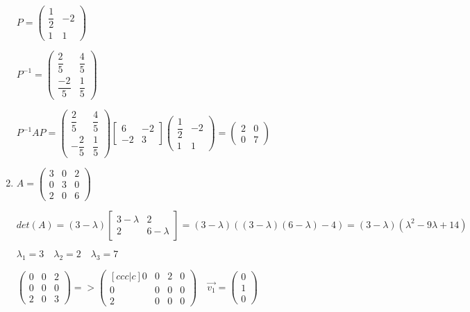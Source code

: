 \documentclass[12pt,letterpaper]{article}
\begin{document}
\begin{enumerate}[label=(\alph*)]
        $P = \begin{pmatrix} \dfrac{1}{2} & -2 \\ 1 & 1 \end{pmatrix}$
        
        $P^{-1} = \begin{pmatrix} \dfrac{2}{5} & \dfrac{4}{5} \\ \dfrac{-2}{5} & \dfrac{1}{5} \end{pmatrix}$
        
        $P^{-1}AP = 
        \begin{pmatrix} \dfrac{2}{5} & \dfrac{4}{5} \\ -\dfrac{2}{5} & \dfrac{1}{5} \end{pmatrix}
        \begin{bmatrix} 6 & -2 \\ -2 & 3 \end{bmatrix}
        \begin{pmatrix} \dfrac{1}{2} & -2 \\ 1 & 1 \end{pmatrix} = 
        \begin{pmatrix} 2 & 0 \\ 0 & 7 \end{pmatrix}
        $
        
        \item
        $A = \begin{pmatrix}
            3 & 0 & 2\\
            0 & 3 & 0\\
            2 & 0 & 6
        \end{pmatrix}$
        
        $det(A) = (3 - \lambda)\begin{bmatrix}
            3 - \lambda & 2 \\
            2 & 6 - \lambda
        \end{bmatrix} = (3 - \lambda)((3 - \lambda)(6 - \lambda) - 4) = (3 - \lambda)(\lambda^2 - 9\lambda + 14)$
        
        $\lambda_1 = 3\quad\lambda_2 = 2\quad\lambda_3 = 7$
        
        $\begin{pmatrix} 0 & 0 & 2 \\ 0 & 0 & 0 \\ 2 & 0 & 3 \end{pmatrix} =>
                \begin{pmatrix}[ccc|c] 0 & 0 & 2 & 0 \\ 0 & 0 & 0 & 0 \\ 2 & 0 & 0 & 0 \end{pmatrix} \quad \vec{v_1} = \begin{pmatrix} 0 \\ 1 \\ 0 \end{pmatrix}$
                

\end{enumerate}
\end{document}
